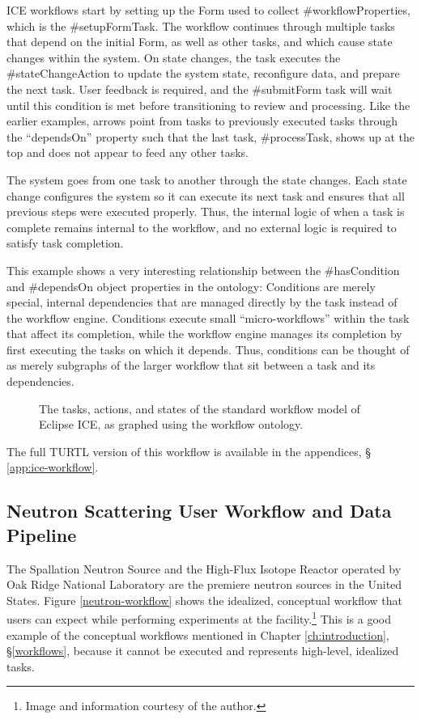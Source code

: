 ICE workflows start by setting up the Form used to collect
\#workflowProperties, which is the \#setupFormTask. The workflow continues
through multiple tasks that depend on the initial Form, as well as other tasks,
and which cause state changes within the system. On state changes, the task
executes the \#stateChangeAction to update the system state, reconfigure data,
and prepare the next task. User feedback is required, and the \#submitForm task
will wait until this condition is met before transitioning to review and
processing. Like the earlier examples, arrows point from tasks to previously
executed tasks through the ``dependsOn'' property such that the last task,
\#processTask, shows up at the top and does not appear to feed any other tasks.

The system goes from one task to another through the state changes. Each state
change configures the system so it can execute its next task and ensures
that all previous steps were executed properly. Thus, the internal logic of when
a task is complete remains internal to the workflow, and no external logic is
required to satisfy task completion.

This example shows a very interesting relationship between the \#hasCondition
and \#dependsOn object properties in the ontology: Conditions are merely
special, internal dependencies that are managed directly by the task instead of the
workflow engine. Conditions execute small ``micro-workflows'' within the task
that affect its completion, while the workflow engine manages its completion by
first executing the tasks on which it depends. Thus, conditions can be thought
of as merely subgraphs of the larger workflow that sit between a task and its
dependencies.

\begin{figure}[htbp]
\centering
{}
\caption{The tasks, actions, and states of the standard workflow model of
Eclipse ICE, as graphed using the workflow ontology.}
\label{ice-workflow}
\end{figure}

The full TURTL version of this workflow is available in the appendices, \S
\ref{app:ice-workflow}.

\subsection{Neutron Scattering User Workflow and Data Pipeline}

The Spallation Neutron Source and the High-Flux Isotope Reactor operated by Oak
Ridge National Laboratory are the premiere neutron sources in the United States.
Figure \ref{neutron-workflow} shows the idealized, conceptual workflow that
users can expect while performing experiments at the
facility.\footnote{Image and information courtesy of the author.} This is a good
example of the conceptual workflows mentioned in Chapter \ref{ch:introduction},
\S \ref{workflows}, because it cannot be executed and represents high-level,
idealized tasks.

